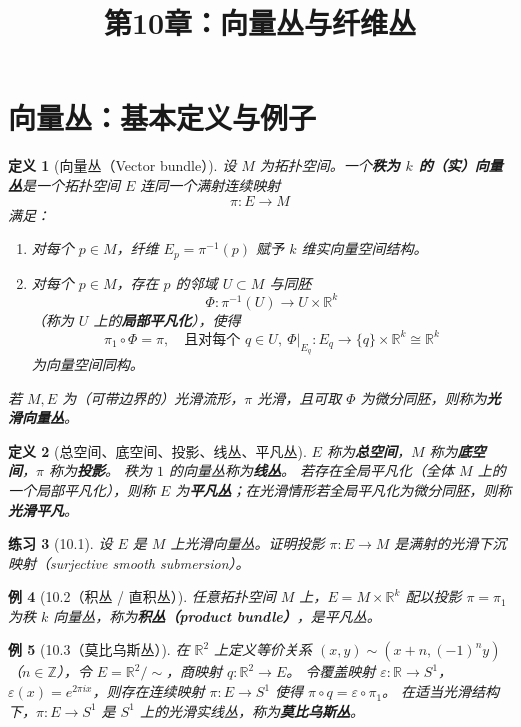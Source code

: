 \documentclass[12pt]{article}
\title{第10章：向量丛与纤维丛}
\author{}
\date{}
\newtheorem{definition}{定义}[section]
\newtheorem{example}[definition]{例}
\newtheorem{exercise}[definition]{练习}
\begin{document}
\maketitle

\tableofcontents

\section{向量丛：基本定义与例子}

\begin{definition}[向量丛（Vector bundle）]
设 $M$ 为拓扑空间。一个\textbf{秩为 $k$ 的（实）向量丛}是一个拓扑空间 $E$ 连同一个满射连续映射
\[
\pi:E\to M
\]
满足：
\begin{enumerate}[label=(\roman*)]
\item 对每个 $p\in M$，纤维 $E_p=\pi^{-1}(p)$ 赋予 $k$ 维实向量空间结构。
\item 对每个 $p\in M$，存在 $p$ 的邻域 $U\subset M$ 与同胚
\[
\Phi:\pi^{-1}(U)\to U\times \mathbb{R}^k
\]
（称为 $U$ 上的\textbf{局部平凡化}），使得
\[
\pi_1\circ \Phi=\pi,\quad \text{且对每个 }q\in U,\ \Phi|_{E_q}:E_q\to \{q\}\times \mathbb{R}^k\cong \mathbb{R}^k
\]
为向量空间同构。
\end{enumerate}
若 $M,E$ 为（可带边界的）光滑流形，$\pi$ 光滑，且可取 $\Phi$ 为微分同胚，则称为\textbf{光滑向量丛}。
\end{definition}

\begin{definition}[总空间、底空间、投影、线丛、平凡丛]
$E$ 称为\textbf{总空间}，$M$ 称为\textbf{底空间}，$\pi$ 称为\textbf{投影}。
秩为 $1$ 的向量丛称为\textbf{线丛}。
若存在全局平凡化（全体 $M$ 上的一个局部平凡化），则称 $E$ 为\textbf{平凡丛}；在光滑情形若全局平凡化为微分同胚，则称\textbf{光滑平凡}。
\end{definition}

\begin{exercise}[10.1]
设 $E$ 是 $M$ 上光滑向量丛。证明投影 $\pi:E\to M$ 是满射的光滑下沉映射（surjective smooth submersion）。
\end{exercise}

\begin{example}[10.2（积丛 / 直积丛）]
任意拓扑空间 $M$ 上，$E=M\times \mathbb{R}^k$ 配以投影 $\pi=\pi_1$ 为秩 $k$ 向量丛，称为\textbf{积丛（product bundle）}，是平凡丛。
\end{example}

\begin{example}[10.3（莫比乌斯丛）]
在 $\mathbb{R}^2$ 上定义等价关系 $(x,y)\sim(x+n,(-1)^n y)$（$n\in\mathbb{Z}$），令 $E=\mathbb{R}^2/\sim$，商映射 $q:\mathbb{R}^2\to E$。
令覆盖映射 $\varepsilon:\mathbb{R}\to S^1$，$\varepsilon(x)=e^{2\pi i x}$，则存在连续映射 $\pi:E\to S^1$ 使得 $\pi\circ q=\varepsilon\circ \pi_1$。
在适当光滑结构下，$\pi:E\to S^1$ 是 $S^1$ 上的光滑实线丛，称为\textbf{莫比乌斯丛}。
\end{example}
\end{document}
